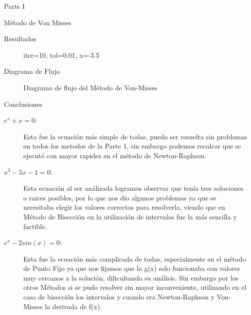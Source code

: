 \documentclass[legalpaper, 12pt]{article}
\def \eqa {\(e^x + x = 0\)}
\def \eqb {\(x^3 - 5x - 1 = 0\)}
\def \eqc {\(e^x - 2sin(x) = 0\)}
\begin{document}
\begin{section}{Parte I}
\begin{subsection}{Método de Von Misses}
\begin{subsubsection}{Resultados}
\begin{enumerate}
\begin{figure}[h]
            \caption{iter=10, tol=0.01, x=-3.5}
          \end{figure}
        \end{enumerate}
      \end{subsubsection}
      \newpage
      \begin{subsubsection}{Diagrama de Flujo}
        \begin{figure}[h]
          \centering
          
          \caption{Diagrama de flujo del Método de Von-Misses}
        \end{figure}
      \end{subsubsection}
      \break
    \end{subsection}
    \begin{subsection}{Conclusiones}
      \begin{description}
        \item[\eqa:] Esta fue la ecuación más simple de todas, puedo
        ser resuelta sin problemas en todos los metodos de la Parte 1, sin embargo
        podemos recalcar que se ejecutó con mayor rapidez en el método de Newton-Raphson.
        \item[\eqb:] Esta ecuación al ser análizada logramos observar que tenía
        tres soluciones o raices posibles, por lo que nos dio algunos problemas
        ya que se necesitaba elegir los valores correctos para resolverla,
        viendo que en Método de Bisección en la utilización de intervalos fue la más
        sencilla y factible.
        \item[\eqc:] Esta fue la ecuación más complicada de todas, especialmente en
        el método de Punto Fijo ya que nos fijamos que la g(x) solo funcionaba con
        valores muy cercanos a la solución, dificultando su análisis. Sin embargo
        por los otros Métodos si se pudo resolver sin mayor inconveniente, utilizando
        en el caso de bisección los intervalos y cuando era Newton-Raphson y Von-Misses
        la derivada de f(x).
      \end{description}
    \end{subsection}
  \end{section}
  \newpage
\end{document}
